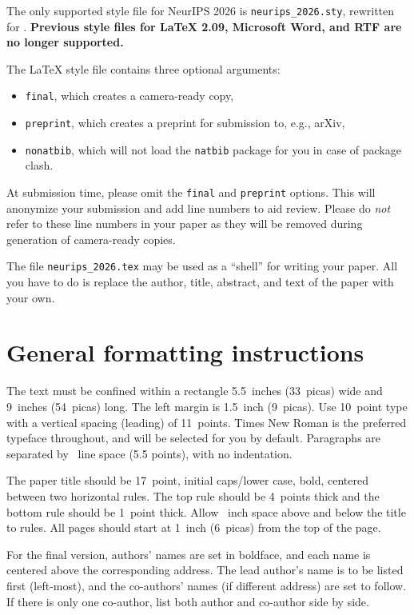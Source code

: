 \documentclass{article}
\begin{document}
The only supported style file for NeurIPS 2026 is \verb+neurips_2026.sty+, rewritten for \LaTeXe{}. \textbf{Previous style files for \LaTeX{} 2.09,  Microsoft Word, and RTF are no longer supported.}


The \LaTeX{} style file contains three optional arguments: 
\begin{itemize}
\item \verb+final+, which creates a camera-ready copy, 
\item \verb+preprint+, which creates a preprint for submission to, e.g., arXiv, \item \verb+nonatbib+, which will not load the \verb+natbib+ package for you in case of package clash.
\end{itemize}



At submission time, please omit the \verb+final+ and \verb+preprint+ options. This will anonymize your submission and add line numbers to aid review. Please do \emph{not} refer to these line numbers in your paper as they will be removed during generation of camera-ready copies.


The file \verb+neurips_2026.tex+ may be used as a ``shell'' for writing your paper. All you have to do is replace the author, title, abstract, and text of the paper with your own.


\section{General formatting instructions}
\label{gen_inst}


The text must be confined within a rectangle 5.5~inches (33~picas) wide and
9~inches (54~picas) long. The left margin is 1.5~inch (9~picas).  Use 10~point
type with a vertical spacing (leading) of 11~points.  Times New Roman is the
preferred typeface throughout, and will be selected for you by default.
Paragraphs are separated by ~line space (5.5 points), with no
indentation.


The paper title should be 17~point, initial caps/lower case, bold, centered
between two horizontal rules. The top rule should be 4~points thick and the
bottom rule should be 1~point thick. Allow ~inch space above and
below the title to rules. All pages should start at 1~inch (6~picas) from the
top of the page.


For the final version, authors' names are set in boldface, and each name is
centered above the corresponding address. The lead author's name is to be listed
first (left-most), and the co-authors' names (if different address) are set to
follow. If there is only one co-author, list both author and co-author side by
side.
\end{document}
